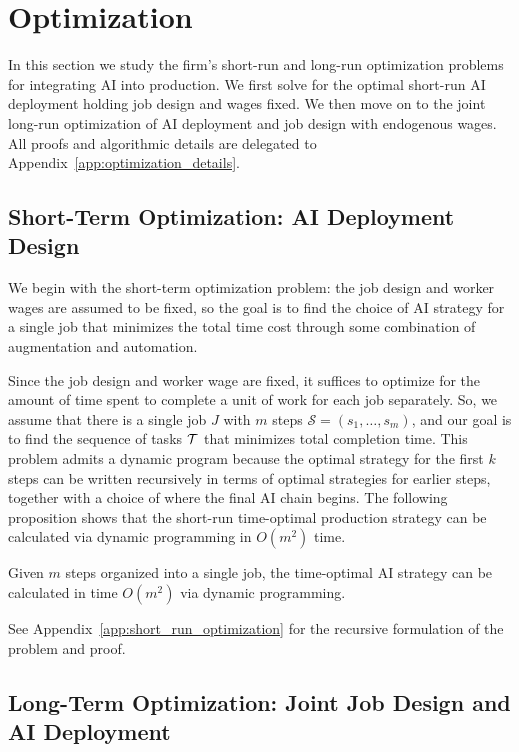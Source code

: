 \section{Optimization}

In this section we study the firm’s short-run and long-run optimization problems for integrating AI into production. 
We first solve for the optimal short-run AI deployment holding job design and wages fixed. 
We then move on to the joint long-run optimization of AI deployment and job design with endogenous wages. 
All proofs and algorithmic details are delegated to Appendix~\ref{app:optimization_details}. 

\subsection{Short-Term Optimization: AI Deployment Design}
\label{sec:optimization.short}

We begin with the short-term optimization problem: the job design and worker wages are assumed to be fixed, so the goal is to find the choice of AI strategy for a single job that minimizes the total time cost through some combination of augmentation and automation.

Since the job design and worker wage are fixed, it suffices to optimize for the amount of time spent to complete a unit of work for each job separately.  
So, we assume that there is a single job $J$ with $m$ steps $\mathcal{S} = (s_1, \dotsc, s_m)$, and our goal is to find the sequence of tasks $\mathcal{T}$ that minimizes total completion time.  
This problem admits a dynamic program because the optimal strategy for the first $k$ steps can be written recursively in terms of optimal strategies for earlier steps, together with a choice of where the final AI chain begins. 
The following proposition shows that the short-run time-optimal production strategy can be calculated via dynamic programming in $O(m^2)$ time.

\begin{proposition}
\label{prop:short_run_optimization}
Given $m$ steps organized into a single job, the time-optimal AI strategy can be calculated in time $O(m^2)$ via dynamic programming.    
\end{proposition}
See Appendix~\ref{app:short_run_optimization} for the recursive formulation of the problem and proof. 



\subsection{Long-Term Optimization: Joint Job Design and AI Deployment}
\label{sec:optimization.long}

